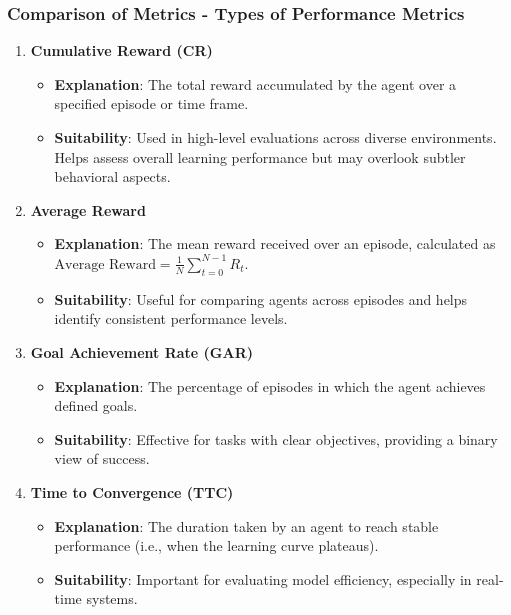 \documentclass[aspectratio=169]{beamer}
\begin{document}
\begin{frame}[fragile]
    \frametitle{Comparison of Metrics - Types of Performance Metrics}
    \begin{enumerate}
        \item \textbf{Cumulative Reward (CR)}
        \begin{itemize}
            \item \textbf{Explanation}: The total reward accumulated by the agent over a specified episode or time frame.
            \item \textbf{Suitability}: Used in high-level evaluations across diverse environments. 
            Helps assess overall learning performance but may overlook subtler behavioral aspects.
        \end{itemize}

        \item \textbf{Average Reward}
        \begin{itemize}
            \item \textbf{Explanation}: The mean reward received over an episode, calculated as 
            \( \text{Average Reward} = \frac{1}{N} \sum_{t=0}^{N-1} R_t \).
            \item \textbf{Suitability}: Useful for comparing agents across episodes and helps identify consistent performance levels.
        \end{itemize}

        \item \textbf{Goal Achievement Rate (GAR)}
        \begin{itemize}
            \item \textbf{Explanation}: The percentage of episodes in which the agent achieves defined goals.
            \item \textbf{Suitability}: Effective for tasks with clear objectives, providing a binary view of success.
        \end{itemize}

        \item \textbf{Time to Convergence (TTC)}
        \begin{itemize}
            \item \textbf{Explanation}: The duration taken by an agent to reach stable performance (i.e., when the learning curve plateaus).
            \item \textbf{Suitability}: Important for evaluating model efficiency, especially in real-time systems.
        \end{itemize}
    \end{enumerate}
\end{frame}
\end{document}
